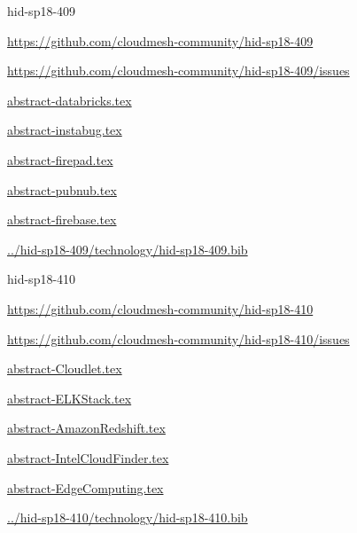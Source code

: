\begin{IU}

hid-sp18-409

\url{https://github.com/cloudmesh-community/hid-sp18-409}

\url{https://github.com/cloudmesh-community/hid-sp18-409/issues}

\href{https://github.com/cloudmesh-community/hid-sp18-409/blob/master//technology/abstract-databricks.tex}{abstract-databricks.tex}

\href{https://github.com/cloudmesh-community/hid-sp18-409/blob/master//technology/abstract-instabug.tex}{abstract-instabug.tex}

\href{https://github.com/cloudmesh-community/hid-sp18-409/blob/master//technology/abstract-firepad.tex}{abstract-firepad.tex}

\href{https://github.com/cloudmesh-community/hid-sp18-409/blob/master//technology/abstract-pubnub.tex}{abstract-pubnub.tex}

\href{https://github.com/cloudmesh-community/hid-sp18-409/blob/master//technology/abstract-firebase.tex}{abstract-firebase.tex}

\href{https://github.com/cloudmesh-community/hid-sp18-409/blob/master//technology/hid-sp18-409.bib}{../hid-sp18-409/technology/hid-sp18-409.bib}

\end{IU}


\begin{IU}

hid-sp18-410

\url{https://github.com/cloudmesh-community/hid-sp18-410}

\url{https://github.com/cloudmesh-community/hid-sp18-410/issues}

\href{https://github.com/cloudmesh-community/hid-sp18-410/blob/master//technology/abstract-Cloudlet.tex}{abstract-Cloudlet.tex}

\href{https://github.com/cloudmesh-community/hid-sp18-410/blob/master//technology/abstract-ELKStack.tex}{abstract-ELKStack.tex}

\href{https://github.com/cloudmesh-community/hid-sp18-410/blob/master//technology/abstract-AmazonRedshift.tex}{abstract-AmazonRedshift.tex}

\href{https://github.com/cloudmesh-community/hid-sp18-410/blob/master//technology/abstract-IntelCloudFinder.tex}{abstract-IntelCloudFinder.tex}

\href{https://github.com/cloudmesh-community/hid-sp18-410/blob/master//technology/abstract-EdgeComputing.tex}{abstract-EdgeComputing.tex}

\href{https://github.com/cloudmesh-community/hid-sp18-410/blob/master//technology/hid-sp18-410.bib}{../hid-sp18-410/technology/hid-sp18-410.bib}

\end{IU}



